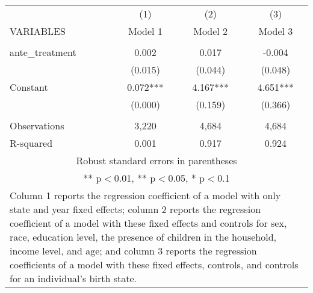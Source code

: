 \begin{tabular}{lccc} \hline
 & (1) & (2) & (3) \\
VARIABLES & Model 1 & Model 2 & Model 3 \\ \hline
 &  &  &  \\
ante\_treatment & 0.002 & 0.017 & -0.004 \\
 & (0.015) & (0.044) & (0.048) \\
Constant & 0.072*** & 4.167*** & 4.651*** \\
 & (0.000) & (0.159) & (0.366) \\
 &  &  &  \\
Observations & 3,220 & 4,684 & 4,684 \\
 R-squared & 0.001 & 0.917 & 0.924 \\ \hline
\multicolumn{4}{c}{\small Robust standard errors in parentheses} \\
\multicolumn{4}{c}{\small *** p$<$0.01, ** p$<$0.05, * p$<$0.1} \\
\multicolumn{4}{p{0.8\linewidth}}{\small Column 1 reports the
regression coefficient of a model with only state and year fixed effects; column 2 reports the
regression coefficient of a model with these fixed effects and controls for sex, race, education
level, the presence of children in the household, income level, and age; and column 3 reports
the regression coefficients of a model with these fixed effects, controls, and controls for an
individual’s birth state.} \\
\end{tabular}
